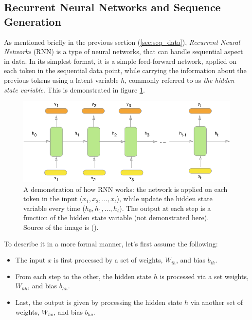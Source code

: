 \subsection{Recurrent Neural Networks and Sequence Generation} \label{sec:RNN}
As mentioned briefly in the previous section (\ref{sec:seq_data}), \textit{Recurrent Neural Networks} (RNN) is a type of neural networks, that can handle sequential aspect in data. In its simplest format, it is a simple feed-forward network, applied on each token in the sequential data point, while carrying the information about the previous tokens using a latent variable $h$, commonly referred to as \textit{the hidden state variable}. This is demonstrated in figure \ref{fig:basic_rnn_model}.

\begin{figure}
    \centering
    \includegraphics[width=\textwidth]{images/gbem/basic_rnn.png}
    \caption{A demonstration of how RNN works: the network is applied on each token in the input ($x_1, x_2, ..., x_t$), while update the hidden state variable every time ($h_0, h_1, ..., h_t$). The output at each step is a function of the hidden state variable (not demonstrated here). Source of the image is (\citep{howrnnworks}).}
    \label{fig:basic_rnn_model}
\end{figure}

\par To describe it in a more formal manner, let's first assume the following:
\begin{itemize}[noitemsep]
    \item The input $x$ is first processed by a set of weights, $W_{ih}$, and bias $b_{ih}$.
    \item From each step to the other, the hidden state $h$ is processed via a set weights, $W_{hh}$, and bias $b_{hh}$.
    \item Last, the output is given by processing the hidden state $h$ via another set of weights, $W_{ho}$, and bias $b_{ho}$.
\end{itemize}


